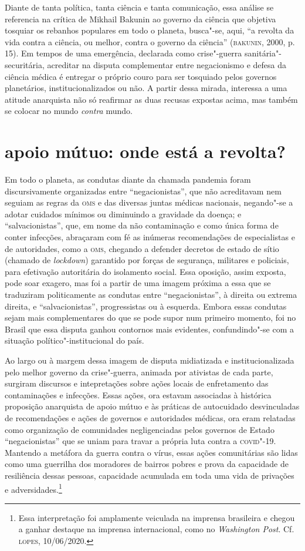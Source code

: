 Diante de tanta política, tanta ciência e tanta comunicação, essa
análise se referencia na crítica de Mikhail Bakunin ao governo da
ciência que objetiva tosquiar os rebanhos populares em todo o planeta,
busca"-se, aqui, ``a revolta da vida contra a ciência, ou melhor, contra
o governo da ciência'' (\textsc{bakunin}, 2000, p. 15). Em tempos de uma
emergência, declarada como crise"-guerra sanitária"-securitária, acreditar
na disputa complementar entre negacionismo e defesa da ciência médica é
entregar o próprio couro para ser tosquiado pelos governos planetários,
institucionalizados ou não. A partir dessa mirada, interessa a uma
atitude anarquista não só reafirmar as duas recusas expostas acima, mas
também se colocar no mundo \emph{contra} mundo.

\section{apoio mútuo: onde está a revolta?}

Em todo o planeta, as condutas diante da chamada pandemia foram
discursivamente organizadas entre ``negacionistas'', que não acreditavam
nem seguiam as regras da \textsc{oms} e das diversas juntas médicas nacionais,
negando"-se a adotar cuidados mínimos ou diminuindo a gravidade da
doença; e ``salvacionistas'', que, em nome da não contaminação e como
única forma de conter infecções, abraçaram com fé as inúmeras
recomendações de especialistas e de autoridades, como a \textsc{oms}, chegando a
defender decretos de estado de sítio (chamado de \emph{lockdown})
garantido por forças de segurança, militares e policiais, para
efetivação autoritária do isolamento social. Essa oposição, assim
exposta, pode soar exagero, mas foi a partir de uma imagem próxima a
essa que se traduziram politicamente as condutas entre
``negacionistas'', à direita ou extrema direita, e ``salvacionistas'',
progressistas ou à esquerda. Embora essas condutas sejam mais
complementares do que se pode supor num primeiro momento, foi no Brasil
que essa disputa ganhou contornos mais evidentes, confundindo"-se com a
situação político"-institucional do país.

Ao largo ou à margem dessa imagem de disputa midiatizada e
institucionalizada pelo melhor governo da crise"-guerra, animada por
ativistas de cada parte, surgiram discursos e intepretações sobre ações
locais de enfretamento das contaminações e infecções. Essas ações, ora
estavam associadas à histórica proposição anarquista de apoio mútuo e às
práticas de autocuidado desvinculadas de recomendações e ações de
governos e autoridades médicas, ora eram relatadas como organização de
comunidades negligenciadas pelos governos de Estado ``negacionistas''
que se uniam para travar a própria luta contra a \textsc{covid}"-19. Mantendo a
metáfora da guerra contra o vírus, essas ações comunitárias são lidas
como uma guerrilha dos moradores de bairros pobres e prova da capacidade
de resiliência dessas pessoas, capacidade acumulada em toda uma vida de
privações e adversidades.\footnote{Essa interpretação foi amplamente
  veiculada na imprensa brasileira e chegou a ganhar destaque na
  imprensa internacional, como no \emph{Washington Post}. Cf. \textsc{lopes},
  10/06/2020.}

